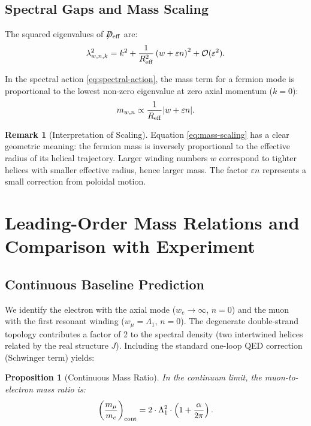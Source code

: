 \documentclass[12pt, a4paper]{article}
\newtheorem{proposition}[theorem]{Proposition}
\theoremstyle{definition}
\newtheorem{remark}[theorem]{Remark}
\newcommand{\cO}{\mathcal{O}}
\newcommand{\notD}{\not\!\!D}
\newcommand{\eps}{\varepsilon}
\begin{document}
\subsection{Spectral Gaps and Mass Scaling}
The squared eigenvalues of $\notD_{\rm eff}$ are:
\begin{equation}
\lambda_{w,n,k}^2 = k^2 + \frac{1}{R_{\rm eff}^2}\left(w + \eps n\right)^2 + \cO(\eps^2).
\label{eq:eigenvalues}
\end{equation}

In the spectral action \eqref{eq:spectral-action}, the mass term for a fermion mode is proportional to the lowest non-zero eigenvalue at zero axial momentum ($k=0$):
\begin{equation}
m_{w,n} \propto \frac{1}{R_{\rm eff}} \abs{w + \eps n}.
\label{eq:mass-scaling}
\end{equation}

\begin{remark}[Interpretation of Scaling]
Equation \eqref{eq:mass-scaling} has a clear geometric meaning: the fermion mass is inversely proportional to the effective radius of its helical trajectory. Larger winding numbers $w$ correspond to tighter helices with smaller effective radius, hence larger mass. The factor $\eps n$ represents a small correction from poloidal motion.
\end{remark}

\section{Leading-Order Mass Relations and Comparison with Experiment}
\label{sec:masses}

\subsection{Continuous Baseline Prediction}
We identify the electron with the axial mode ($w_e \to \infty$, $n=0$) and the muon with the first resonant winding ($w_\mu = \Lambda_1$, $n=0$). The degenerate double-strand topology contributes a factor of 2 to the spectral density (two intertwined helices related by the real structure $J$). Including the standard one-loop QED correction (Schwinger term) yields:

\begin{proposition}[Continuous Mass Ratio]
\label{prop:mass-ratio-continuous}
In the continuum limit, the muon-to-electron mass ratio is:
\begin{equation}
\left(\frac{m_\mu}{m_e}\right)_{\rm cont} = 2 \cdot \Lambda_1^2 \cdot \left(1 + \frac{\alpha}{2\pi}\right).
\label{eq:mass-ratio-cont}
\end{equation}
\end{proposition}
\end{document}
